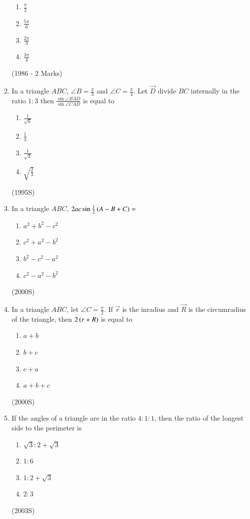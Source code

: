 \begin{enumerate}[label=\thesubsection.\arabic*,ref=\thesubsection.\theenumi]
\begin{multicols}{2}
\begin{enumerate}
     \item $\frac{\pi}{2}$
     \item $\frac{5\pi}{6}$
     \item $\frac{2\pi}{3}$
     \item $\frac{3\pi}{4}$ 
	    \end{enumerate}
	    \end{multicols}
		\hfill (1986 - 2 Marks)
\item In a triangle $ABC$, $\angle B = \frac{\pi}{3}$ and $\angle C = \frac{\pi}{4}$. Let $\vec{D}$ divide $BC$ internally in the ratio $1\colon3$ then $\frac{\sin\angle BAD}{\sin \angle CAD}$ is equal to
\begin{enumerate}
\item $\frac{1}{\sqrt6}$
\item $\frac{1}{3}$
\item $\frac{1}{\sqrt3}$
\item $\sqrt{\frac{2}{3}}$
\end{enumerate}
\hfill (1995S)

\item In a triangle $ABC$, $2ac\sin\frac{1}{2}\left(A-B+C\right) = $
\begin{enumerate}
\item $a^2 + b^2 - c^2$
\item $c^2 + a^2 - b^2$
\item $b^2 - c^2 - a^2$
\item $c^2 - a^2 - b^2$
\end{enumerate}
\hfill (2000S)

\item In a triangle $ABC$, let $\angle C = \frac{\pi}{2}$. If $\vec{r}$ is the inradius and $\vec{R}$ is the circumradius of the triangle, then $2\left(r+R\right)$ is equal to
\begin{enumerate}
\item $a+b$
\item $b+c$
\item $c+a$
\item $a+b+c$
\end{enumerate}
\hfill (2000S)



\item If the angles of a triangle are in the ratio $4\colon1\colon1$, then the ratio of the longest side to the perimeter is
\begin{enumerate}
\item $\sqrt{3}\colon2+\sqrt{3}$
\item $1\colon6$
\item $1\colon2+\sqrt{3}$
\item $2\colon3$
\end{enumerate}
\hfill (2003S)


\end{enumerate}
